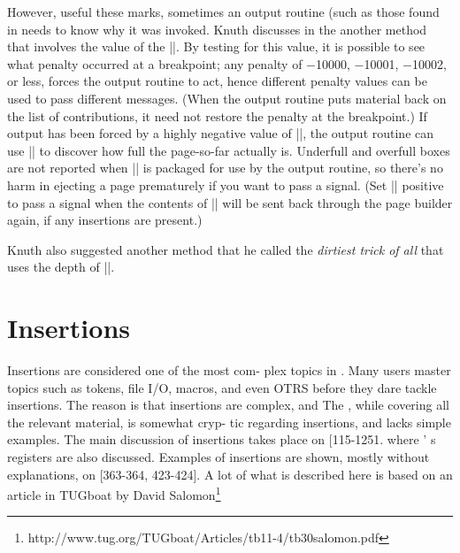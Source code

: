 \newdimen\theight 
\def \TeXref#1{%
             \vadjust{\setbox0=\hbox{\sevenrm\quad\quad\TeX book: #1}%
             \theight=\ht0 
             \advance\theight by \dp0    \advance\theight by \lineskip 
             \kern -\theight \vbox to \theight{\rightline{\rlap{\box0}}%
             \vss}%
             }}%
 
However, useful these marks, sometimes an output routine (such as those found in \latexe needs to know why it was invoked. Knuth discusses in the \TeXref{396}  another method
that involves the value of the |\outputpenalty|. 
By testing for this value, it is possible to see what penalty occurred at a breakpoint;
any penalty of −10000, −10001, −10002, or less, forces the output routine to
act, hence different penalty values can be used to pass different messages. (When
the output routine puts material back on the list of contributions, it need not restore
the penalty at the breakpoint.) If output has been forced by a highly negative value
of |\outputpenalty|, the output routine can use |\vbox{}| to discover how
full the page-so-far actually is. Underfull and overfull boxes are not reported when
|| is packaged for use by the output routine, so there’s no harm in ejecting a
page prematurely if you want to pass a signal. (Set |\holdinginserts| positive to pass
a signal when the contents of || will be sent back through the page builder again,
if any insertions are present.)

Knuth also suggested another method that he called the \emph{dirtiest trick of all} that uses the depth 
of ||. 

\section{Insertions}
Insertions are considered one of  the most  com- 
plex  topics in \tex. Many users master  topics  such 
as tokens,  file  I/O, macros,  and  even  OTRS  before 
they dare  tackle  insertions.  The  reason  is  that 
insertions  are  complex,  and  The \texbook, while 
covering all the relevant material, is somewhat cryp- 
tic regarding  insertions, and  lacks  simple examples. 
The  main  discussion  of  insertions takes  place  on 
[115-1251.  where \tex' s  registers  are also discussed. 
Examples  of  insertions are  shown, mostly  without 
explanations,  on  [363-364,  423-424].  A lot of what is described here is based on an article in TUGboat by David Salomon\footnote{ 
http://www.tug.org/TUGboat/Articles/tb11-4/tb30salomon.pdf}


